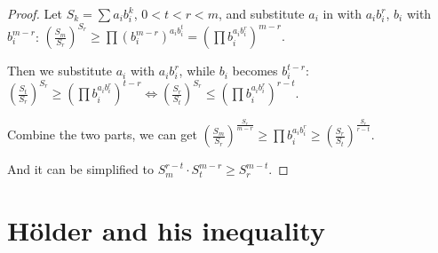 \begin{proof}[Proof]
    Let $S_k = \sum a_i b_i^k$, $0 < t < r < m$, and substitute $a_i$ in  with $a_i b_i^r$, $b_i$ with $b_i^{m-r}$:
    \begin{math}
        (\frac{S_m}{S_r})^{S_r} \ge \prod (b_i^{m-r})^{a_i b_i^t} = (\prod b_i^{a_i b_i^r})^{m-r}
    .\end{math}

    Then we substitute $a_i$ with $a_i b_i^r$, while $b_i$ becomes $b_i^{t-r}$:
    \begin{math}
        (\frac{S_t}{S_r})^{S_r} \ge (\prod b_i^{a_i b_i^r})^{t-r} \iff
        (\frac{S_r}{S_t})^{S_r} \le (\prod b_i^{a_i b_i^r})^{r-t}
    .\end{math}

    Combine the two parts, we can get
    \begin{math}
        (\frac{S_m}{S_r})^{\frac{S_r}{m-r}} \ge \prod b_i^{a_i b_i^r} \ge (\frac{S_r}{S_t})^\frac{S_r}{r-t}
    .\end{math}

    And it can be simplified to
    \begin{math}
        S_m^{r-t} \cdot S_t^{m-r} \ge S_r^{m-t}
    .\end{math}
\end{proof}

\section{Hölder and his inequality}

